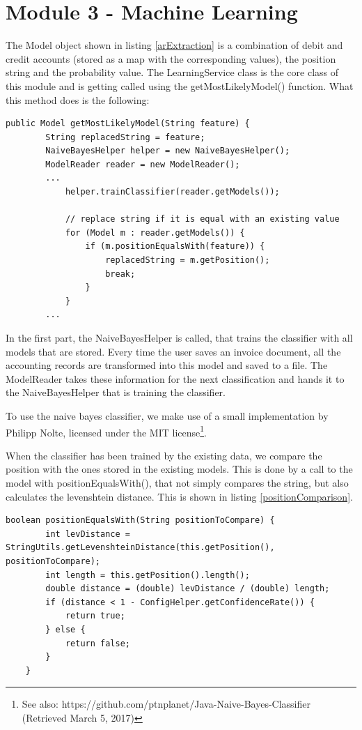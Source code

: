 \section{Module 3 - Machine Learning}

The Model object shown in listing \ref{arExtraction} is a combination of debit and credit accounts (stored as a map with the corresponding values), the position string and the probability value. The LearningService class is the core class of this module and is getting called using the getMostLikelyModel() function. What this method does is the following:

\begin{lstlisting}[caption={Search for the most likely model}]
 public Model getMostLikelyModel(String feature) {
        String replacedString = feature;
        NaiveBayesHelper helper = new NaiveBayesHelper();
        ModelReader reader = new ModelReader();
        ...
            helper.trainClassifier(reader.getModels());

            // replace string if it is equal with an existing value
            for (Model m : reader.getModels()) {
                if (m.positionEqualsWith(feature)) {
                    replacedString = m.getPosition();
                    break;
                }
            }
		...
\end{lstlisting}

In the first part, the NaiveBayesHelper is called, that trains the classifier with all models that are stored. Every time the user saves an invoice document, all the accounting records are transformed into this model and saved to a file. The ModelReader takes these information for the next classification and hands it to the NaiveBayesHelper that is training the classifier.


To use the naive bayes classifier, we make use of a small implementation by Philipp Nolte, licensed under the MIT license\footnote{See also: https://github.com/ptnplanet/Java-Naive-Bayes-Classifier (Retrieved March 5, 2017)}.

When the classifier has been trained by the existing data, we compare the position with the ones stored in the existing models. This is done by a call to the model with positionEqualsWith(), that not simply compares the string, but also calculates the levenshtein distance. This is shown in listing \ref{positionComparison}.

\begin{lstlisting}[caption={Comparison between positions},label={positionComparison}]
    boolean positionEqualsWith(String positionToCompare) {
        int levDistance = StringUtils.getLevenshteinDistance(this.getPosition(), positionToCompare);
        int length = this.getPosition().length();
        double distance = (double) levDistance / (double) length;
        if (distance < 1 - ConfigHelper.getConfidenceRate()) {
            return true;
        } else {
            return false;
        }
    }
\end{lstlisting}

